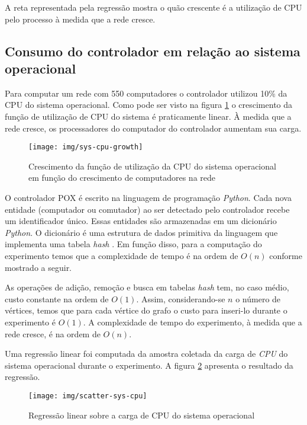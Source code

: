 A reta representada pela regressão mostra o quão crescente é a utilização de 
CPU pelo processo à medida que a rede cresce.


\subsection{Consumo do controlador em relação ao sistema operacional}

Para computar um rede com 550 computadores o controlador utilizou 10\% da 
CPU do sistema operacional.
Como pode ser visto na figura \ref{fig:sys-cpu-growth} o crescimento da 
função de utilização de CPU do sistema é praticamente linear.
À medida que a rede cresce, os processadores do computador do controlador 
aumentam sua carga.

\begin{figure}[!htb]
    \centering
    \label{fig:sys-cpu-growth}
    \texttt{[image: img/sys-cpu-growth]}
    \caption{Crescimento da função de utilização da CPU do sistema operacional
    em função do crescimento de computadores na rede}
\end{figure}

O controlador POX é escrito na linguagem de programação \emph{Python}.
Cada nova entidade (computador ou comutador) ao ser detectado pelo controlador
recebe um identificador único.
Essas entidades são armazenadas em um dicionário \emph{Python}.
O dicionário é uma estrutura de dados primitiva da linguagem que implementa
uma tabela \emph{hash} \citep{maurer1975hash}.
Em função disso, para a computação do experimento temos que a complexidade 
de tempo é na ordem de $O(n)$ conforme mostrado a seguir.

As operações de adição, remoção e busca em tabelas \emph{hash} tem, no 
caso médio, custo constante na ordem de $O(1)$.
Assim, considerando-se $n$ o número de vértices, temos que para cada 
vértice do grafo o custo para inseri-lo durante o experimento é $O(1)$.
A complexidade de tempo do experimento, à medida que a rede cresce, é na 
ordem de $O(n)$.

Uma regressão linear foi computada da amostra coletada da carga de \emph{CPU}
do sistema operacional durante o experimento. 
A figura \ref{fig:scatter-sys-cpu} apresenta o resultado da regressão.

\begin{figure}[!htb]
    \centering
    \label{fig:scatter-sys-cpu}
    \texttt{[image: img/scatter-sys-cpu]}
    \caption{Regressão linear sobre a carga de CPU do sistema operacional}
\end{figure}


